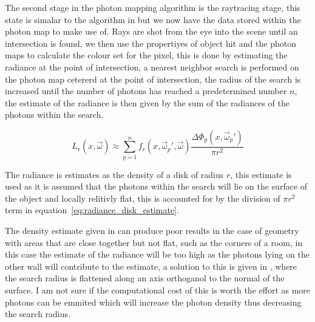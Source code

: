 The second stage in the photon mapping algorithm is the raytracing stage, this state is simalar
to the algorithm in \cite{whitted79a} but we now have the data stored within the photon map to make
use of. Rays are shot from the eye into the scene until an intersection is found, we then use
the propertiyes of object hit and the photon maps to calculate the colour set for the pixel, this
is done by estimating the radiance at the point of intersection, a nearest neighbor search is
performed on the photon map cetererd at the point of intersection, the radius of the search is
increased until the number of photons has reached a predetermined number $n$, the estimate of the
radiance is then given by the sum of the radiances of the photons within the search.

\begin{equation}
\label{eq:radiance_disk_estimate}
L_{r}(x, \vec{\omega})
\approx
\sum_{p=1}^n
f_{r}(x,\vec{\omega}_{p}', \vec{\omega})
\frac
{
	\Delta\Phi_{p}(x, \vec{\omega}_{p}')
}
{
\pi r^{2}
}
\end{equation}

The radiance is estimates as the density of a disk of radius $r$, this estimate is used as it is
assumed that the photons within the search will lie on the surface of the object and locally 
relitivly flat, this is accounted for by the division of $\pi r^2$ term in equation~\ref{eq:radiance_disk_estimate}.

The density estimate given in \cite{Jensen96a} can produce poor results in the case of geometry with
areas that are close together but not flat, such as the corners of a room, in this case the
estimate of the radiance will be too high as the photons lying on the other wall will contribute to
the estimate, a solution to this is given in \cite{JensenBook}, where the search radius is flattened along
an axis orthoganol to the normal of the surface. I am not sure if the computational cost of this
is worth the effort as more photons can be emmited which will increase the photon density thus
decreasing the search radius.
